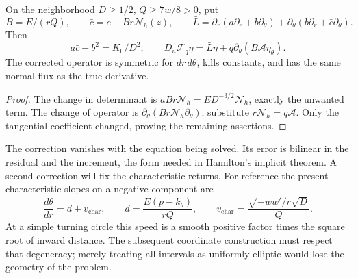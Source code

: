 \begin{lemma}\label{lem:type-completion}
On the neighborhood $D\ge1/2$, $Q\ge7w/8>0$, put
\[
 B=E/(rQ),\qquad \bar c=c-Br\mathcal N_h(z),\qquad
 \bar L=\partial_r(a\partial_r+b\partial_\theta)
             +\partial_\theta(b\partial_r+\bar c\partial_\theta).
\]
Then
\begin{equation}\label{eq:cart-completed-normalized-derivative}
 a\bar c-b^2=K_0/D^2,\qquad
 D_u\mathcal F_q\eta=\bar L\eta+
                 q\partial_\theta(B\mathcal A\eta_\theta).
\end{equation}
The corrected operator is symmetric for $dr\,d\theta$, kills
constants, and has the same normal flux as the true derivative.
\end{lemma}

\begin{proof}
The change in determinant is
$aBr\mathcal N_h=ED^{-3/2}\mathcal N_h$, exactly the unwanted
term. The change of operator is
$\partial_\theta(Br\mathcal N_h\partial_\theta)$;
substitute $r\mathcal N_h=q\mathcal A$.
Only the tangential coefficient changed, proving the remaining
assertions.
\end{proof}

The correction vanishes with the equation being solved. Its error
is bilinear in the residual and the increment, the form needed in
Hamilton's implicit theorem. A second correction will fix the
characteristic returns. For reference the present characteristic
slopes on a negative component are
\begin{equation}\label{eq:completed-characteristics}
 \frac{d\theta}{dr}=d\pm v_{\mathrm{char}},\qquad
 d=\frac{E(p-k_\theta)}{rQ},\qquad
 v_{\mathrm{char}}=\frac{\sqrt{-ww'/r}\sqrt D}{Q}.
\end{equation}
At a simple turning circle this speed is a smooth positive factor
times the square root of inward distance. The subsequent coordinate
construction must respect that degeneracy; merely treating all
intervals as uniformly elliptic would lose the geometry of the problem.
